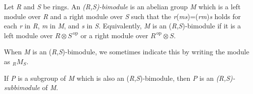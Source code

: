 \documentclass[12pt]{article}
\newcommand{\opposite}[1]{{#1}^{\,\mathrm{op}}}
\newcommand{\fm}[1]{{\it #1}}
\begin{document}
Let \fm{R} and \fm{S} be rings.  An \emph{(\fm{R},\fm{S})-bimodule} is
an abelian group \fm{M} which is a left module over \fm{R} and a right
module over \fm{S} such that the \fm{r}(\fm{ms})=(\fm{rm})\fm{s} holds
for each \fm{r} in \fm{R}, \fm{m} in \fm{M}, and \fm{s} in \fm{S}.
Equivalently, \fm{M} is an (\fm{R},\fm{S})-bimodule if it is a left
module over $R\otimes\opposite{S}$ or a right module over
$\opposite{R}\otimes S$.

When \fm{M} is an (\fm{R},\fm{S})-bimodule, we sometimes indicate this
by writing the module as ${}_RM_S$.

If \fm{P} is a subgroup of \fm{M} which is also an
(\fm{R},\fm{S})-bimodule, then \fm{P} is an
\emph{(\fm{R},\fm{S})-subbimodule} of \fm{M}.

\end{document}
